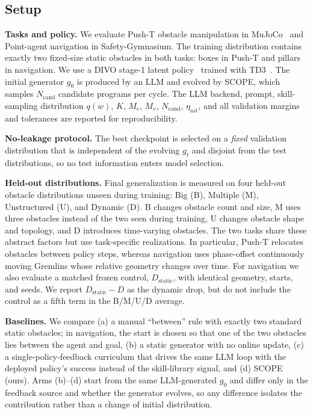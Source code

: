 \documentclass[conference]{IEEEtran}
\begin{document}
\subsection{Setup}
\textbf{Tasks and policy.} We evaluate Push-T obstacle manipulation in
MuJoCo~\cite{todorov2012mujoco} and Point-agent navigation in Safety-Gymnasium.
The training distribution contains exactly two fixed-size static obstacles in
both tasks: boxes in Push-T and pillars in navigation. We use a DIVO stage-1
latent policy~\cite{divo} trained with TD3~\cite{td3}.
The initial generator $g_0$ is produced by an LLM and evolved by SCOPE, which
samples $N_{\mathrm{cand}}$ candidate programs per cycle. The LLM backend,
prompt, skill-sampling distribution $q(w)$, $K$, $M_c$, $M_v$,
$N_{\mathrm{cand}}$, $\eta_{\mathrm{sat}}$, and all validation margins and
tolerances are reported for reproducibility.

\textbf{No-leakage protocol.} The best checkpoint is selected on a \emph{fixed}
validation distribution that is independent of the evolving $g_t$ and disjoint
from the test distributions, so no test information enters model selection.

\textbf{Held-out distributions.} Final generalization is measured on four held-out
obstacle distributions unseen during training: Big (B), Multiple (M),
Unstructured (U), and Dynamic (D). B changes obstacle count and size, M uses
three obstacles instead of the two seen during training, U changes obstacle
shape and topology, and D introduces time-varying obstacles. The two tasks share
these abstract factors but use task-specific realizations. In particular,
Push-T relocates obstacles between policy steps, whereas navigation uses
phase-offset continuously moving Gremlins whose relative geometry changes over time.
For navigation we also evaluate a matched frozen
control, $D_{\mathrm{static}}$, with identical geometry, starts, and seeds. We
report $D_{\mathrm{static}}-D$ as the dynamic drop, but do not include the
control as a fifth term in the B/M/U/D average.

\textbf{Baselines.} We compare (a) a manual ``between'' rule with exactly two
standard static obstacles; in navigation, the start is chosen so that one of
the two obstacles lies between the agent and goal, (b) a static generator with no online update,
(c) a single-policy-feedback curriculum that drives the same LLM loop with the
deployed policy's success instead of the skill-library signal, and (d) SCOPE
(ours). Arms (b)--(d) start from the same LLM-generated $g_0$ and differ only in
the feedback source and whether the generator evolves, so any difference isolates
the contribution rather than a change of initial distribution.
\end{document}
